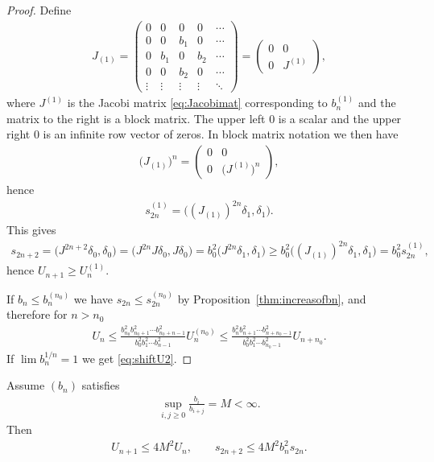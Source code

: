 \begin{proof} Define
\begin{gather*}
J_{(1)}=\begin{pmatrix} 0 & 0 & 0 & 0 & \cdots\\
 0 & 0 & b_1 & 0 & \cdots\\
 0 & b_1 & 0 & b_2 & \cdots\\
 0 & 0 & b_2 & 0 & \cdots\\
 \vdots & \vdots & \vdots & \vdots & \ddots
\end{pmatrix}=
\begin{pmatrix} 0 & 0\\
0 & J^{(1)}
\end{pmatrix},
\end{gather*}
where $J^{(1)}$ is the Jacobi matrix \eqref{eq:Jacobimat} corresponding to $b_n^{(1)}$ and the matrix to the right is a block matrix. The upper left $0$ is a scalar and the upper right $0$ is an infinite row vector of zeros. In block matrix notation we then have
\begin{gather*}
\big(J_{(1)}\big)^n=\begin{pmatrix} 0 & 0\\
0 & \big(J^{(1)}\big)^n
\end{pmatrix},
\end{gather*}
hence
\begin{gather*}
s_{2n}^{(1)}=\big((J_{(1)})^{2n} \delta_1,\delta_1\big).
\end{gather*}
This gives
\begin{gather*}
s_{2n+2} = \big(J^{2n+2}\delta_0,\delta_0\big)=\big(J^{2n}J\delta_0,J\delta_0\big)=b_0^2\big(J^{2n}\delta_1,\delta_1\big)
\ge b_0^2 \big((J_{(1)})^{2n} \delta_1,\delta_1\big)=b_0^2s_{2n}^{(1)},
\end{gather*}
hence $U_{n+1}\ge U_n^{(1)}$.

If $b_n\le b_n^{(n_0)}$ we have $s_{2n}\le s_{2n}^{(n_0)}$ by Proposition~\ref{thm:increasofbn}, and therefore for $n>n_0$
\begin{gather*}
U_n\le \frac{b_{n_0}^2b_{n_0+1}^2\cdots b_{n_0+n-1}^2}{b_0^2 b_1^2\cdots b_{n-1}^2}U_n^{(n_0)}\le \frac{b_n^2b_{n+1}^2\cdots b_{n+n_0-1}^2}{b_0^2 b_1^2\cdots b_{n_0-1}^2}U_{n+n_0}.
\end{gather*}
If $\lim b_n^{1/n}=1$ we get \eqref{eq:shiftU2}.
\end{proof}

\begin{lem}\label{thm:b_i/b_{i+1}} Assume $(b_n)$ satisfies
\begin{gather*}
\sup_{i,j\ge 0}\frac{b_i}{b_{i+j}}=M<\infty.
\end{gather*}
Then
\begin{gather}\label{eq:Un+1}
U_{n+1}\le 4M^2U_n,\qquad s_{2n+2}\le 4M^2b_n^2s_{2n}.
\end{gather}
\end{lem}

